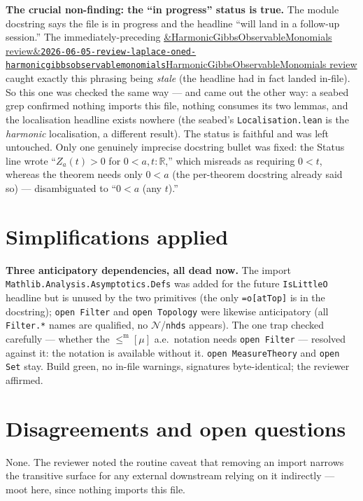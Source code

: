 \documentclass[11pt]{article}
\newcommand{\reviewref}[2][]{\href{https://therisensea.org/reviews/#2/}{\ifx&#1&\texttt{#2}\else#1\fi}}
\begin{document}
\textbf{The crucial non-finding: the ``in progress'' status is true.} The module docstring says the
file is in progress and the headline ``will land in a follow-up session.'' The immediately-preceding
\reviewref[HarmonicGibbsObservableMonomials review]{2026-06-05-review-laplace-oned-harmonicgibbsobservablemonomials}
caught exactly this phrasing being \emph{stale} (the headline had in fact landed in-file). So this one
was checked the same way --- and came out the other way: a seabed grep confirmed nothing imports this
file, nothing consumes its two lemmas, and the localisation headline exists nowhere (the seabed's
\texttt{Localisation.lean} is the \emph{harmonic} localisation, a different result). The status is
faithful and was left untouched. Only one genuinely imprecise docstring bullet was fixed: the Status
line wrote ``$Z_a(t)>0$ for $0<a,t:\mathbb R$,'' which misreads as requiring $0<t$, whereas the
theorem needs only $0<a$ (the per-theorem docstring already said so) --- disambiguated to ``$0<a$
(any $t$).''

\section{Simplifications applied}
\textbf{Three anticipatory dependencies, all dead now.} The import
\texttt{Mathlib.Analysis.Asymptotics.Defs} was added for the future \texttt{IsLittleO} headline but is
unused by the two primitives (the only \texttt{=o[atTop]} is in the docstring); \texttt{open Filter}
and \texttt{open Topology} were likewise anticipatory (all \texttt{Filter.*} names are qualified, no
$\mathcal N$/\texttt{nhds} appears). The one trap checked carefully --- whether the
$\le^{\mathrm m}[\mu]$ a.e.\ notation needs \texttt{open Filter} --- resolved against it: the notation
is available without it. \texttt{open MeasureTheory} and \texttt{open Set} stay. Build green, no
in-file warnings, signatures byte-identical; the reviewer affirmed.

\section{Disagreements and open questions}
None. The reviewer noted the routine caveat that removing an import narrows the transitive surface for
any external downstream relying on it indirectly --- moot here, since nothing imports this file.
\end{document}
